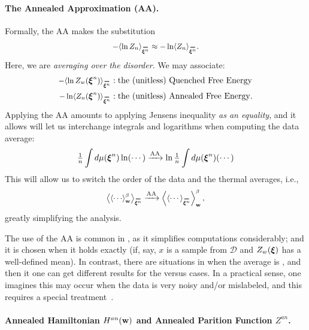 {\paragraph{The Annealed Approximation (AA).} 
Formally, the AA makes the substitution
\begin{align}
\label{eqn:AA}
-\langle\ln Z_{n}\rangle_{\AVGNDXIn}\approx-\ln \langle Z_{n}\rangle_{\AVGNDXIn}.
\end{align}
Here, we are \emph{averaging over the disorder}.
We may associate: 
\begin{eqnarray*}
    -\langle\ln Z_w(\NDXIn)\rangle_{\AVGNDXIn} &: \mbox{the (unitless) \Quenched \FreeEnergy} \\
    -\ln \langle Z_{n}(\NDXIn)\rangle_{\AVGNDXIn} &: \mbox{the (unitless) \Annealed \FreeEnergy}.
\end{eqnarray*}
Applying the AA amounts to applying Jensens inequality \emph{as an equality}, 
and it allows will let us interchange integrals and logarithms when computing the data average:
\begin{align}
\label{eqn:Jensens}
\tfrac{1}{n}\int d\mu(\boldsymbol{\xi}^{n})\ln(\cdots)   
\xrightarrow {\text{AA}}
\ln\tfrac{1}{n}\int d\mu(\boldsymbol{\xi}^{n})(\cdots)
\end{align}
This will allow us to switch the order of the data and the thermal averages, i.e.,
\begin{align}
\label{eqn:switch}
\left\langle \THRMAVGw{\cdots} \right\rangle_{\AVGNDXIn}
\xrightarrow{\text{AA}}
\THRMAVGw{\left\langle \cdots \right\rangle_{\AVGNDXIn}},
\end{align}
greatly simplifying the analysis.

The use of the AA is common in \STATMECH, as it simplifies computations considerably; and 
it is chosen when it holds exactly (if, say, $x$ is a \Typical sample from $\mathcal{D}$ and $Z_w(\boldsymbol{\xi})$ has a well-defined mean).
In contrast, there are situations in \STATMECH when the average is \ATypical, and then it one can get different results for the \Quenched versus \Annealed cases.  In a practical sense, one imagines this may occur when the data is very
noisy and/or mislabeled, and this requires a special treatment~\cite{SST92}.

\paragraph{Annealed Hamiltonian $H^{an}({\mathbf{w}})$ and Annealed Parition Function $Z^{an}$.}

}
